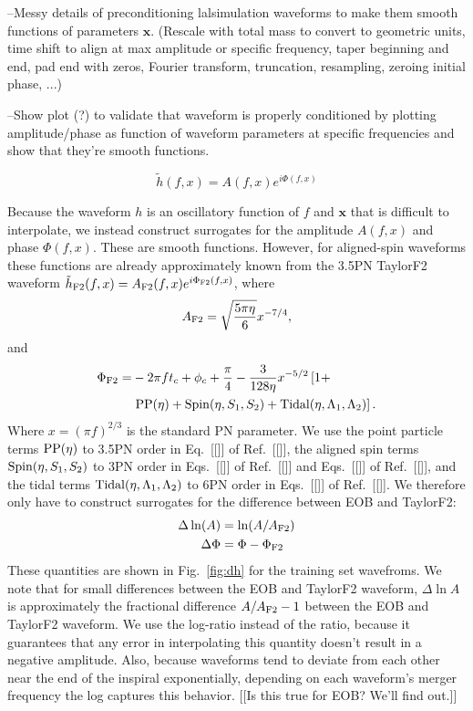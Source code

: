 \documentclass[prd,aps,letter,twocolumn,floatfix,notitlepage,nofootinbib]{revtex4-1}
\begin{document}
--Messy details of preconditioning lalsimulation waveforms to make them smooth functions of parameters ${\bm x}$.
(Rescale with total mass to convert to geometric units, time shift to align at max amplitude or specific frequency, 
taper beginning and end, pad end with zeros, Fourier transform, truncation, resampling, zeroing initial phase, ...)

--Show plot (?) to validate that waveform is properly conditioned by plotting amplitude/phase as function of waveform parameters
at specific frequencies and show that they're smooth functions.

\begin{equation}
\tilde h(f, x) = A(f, x) e^{i\Phi(f, x)}
\end{equation}

Because the waveform $h$ is an oscillatory function of $f$ and ${\bm x}$ that is difficult to interpolate, we instead construct 
surrogates for the amplitude $A(f, x)$ and phase $\Phi(f, x)$. These are smooth functions. However, for aligned-spin waveforms
these functions are already approximately known from the 3.5PN TaylorF2 waveform 
$\tilde h_{\rm F2}(f, x) = A_{\rm F2}(f, x) e^{i\Phi_{\rm F2} (f, x)}$, where
\begin{equation}
A_{\rm F2} = \sqrt{\frac{5\pi\eta}{6}} x^{-7/4},
\end{equation}
and
\begin{align}
\Phi_{\rm F2} =& -2\pi f t_c + \phi_c + \frac{\pi}{4} - \frac{3}{128\eta}x^{-5/2} \left[1 + \right. \\
                        & \left. {\rm PP}(\eta) + {\rm Spin}(\eta, S_1, S_2) + {\rm Tidal}(\eta, \Lambda_1, \Lambda_2)  \right].
\end{align}
Where $x=(\pi f)^{2/3}$ is the standard PN parameter. We use the point particle terms ${\rm PP}(\eta)$ to 3.5PN order in Eq.~[[]] of Ref.~[[]], the aligned spin terms ${\rm Spin}(\eta, S_1, S_2)$ to 3PN order in Eqs.~[[]] of Ref.~[[]] and Eqs.~[[]] of Ref.~[[]], and the tidal terms ${\rm Tidal}(\eta, \Lambda_1, \Lambda_2)$ to 6PN order in Eqs.~[[]] of Ref.~[[]]. We therefore only have to construct surrogates for the difference between EOB and TaylorF2:
\begin{align}
\Delta\ln(A) &= \ln(A/A_{\rm F2})\\
\Delta\Phi & = \Phi - \Phi_{\rm F2}
\end{align}
These quantities are shown in Fig.~\ref{fig:dh} for the training set wavefroms. We note that for small differences 
between the EOB and TaylorF2 waveform, $\Delta\ln A$ is approximately the fractional difference $A/A_{\rm F2} - 1$
between the EOB and TaylorF2 waveform. We use the log-ratio instead of the ratio, because it guarantees that any
error in interpolating this quantity doesn't result in a negative amplitude. Also, because waveforms tend to deviate from 
each other near the end of the inspiral exponentially, depending on each waveform's merger frequency the log captures
this behavior. [[Is this true for EOB? We'll find out.]]
\end{document}
